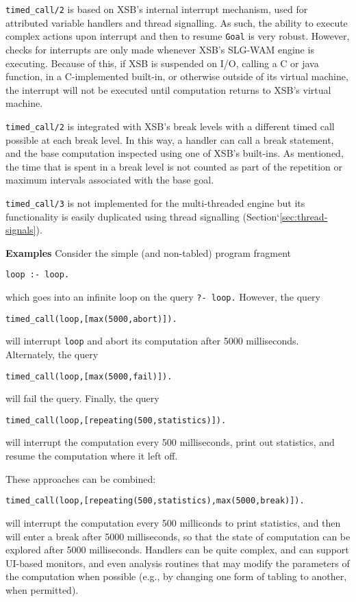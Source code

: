 \begin{description}
{\tt timed\_call/2} is based on XSB's internal interrupt mechanism,
used for attributed variable handlers and thread signalling.  As such,
the ability to execute complex actions upon interrupt and then to
resume {\tt Goal} is very robust.  However, checks for interrupts are
only made whenever XSB's SLG-WAM engine is executing.  Because of
this, if XSB is suspended on I/O, calling a C or java function, in a
C-implemented built-in, or otherwise outside of its virtual machine,
the interrupt will not be executed until computation returns to XSB's
virtual machine.

{\tt timed\_call/2} is integrated with XSB's break levels with a
different timed call possible at each break level.  In this way, a
handler can call a break statement, and the base computation inspected
using one of XSB's built-ins.  As mentioned, the time that is spent in
a break level is not counted as part of the repetition or maximum intervals associated with the base goal.

{\tt timed\_call/3} is not implemented for the multi-threaded engine
but its functionality is easily duplicated using thread signalling
(Section`\ref{sec:thread-signals}).

{\bf Examples}
Consider the simple (and non-tabled) program fragment
\begin{verbatim}
loop :- loop.
\end{verbatim}
which goes into an infinite loop on the query {\tt ?- loop.}  However,
the query
\begin{verbatim}
timed_call(loop,[max(5000,abort)]).
\end{verbatim}
will interrupt {\tt loop} and abort its computation after 5000
milliseconds.  Alternately, the query
\begin{verbatim}
timed_call(loop,[max(5000,fail)]).
\end{verbatim}
will fail the query.  Finally, the query
\begin{verbatim}
timed_call(loop,[repeating(500,statistics)]).
\end{verbatim}
will interrupt the computation every 500 milliseconds, print out
statistics, and resume the computation where it left off.

These approaches can be combined: 
\begin{verbatim}
timed_call(loop,[repeating(500,statistics),max(5000,break)]).
\end{verbatim}
will interrupt the computation every 500 milliconds to print
statistics, and then will enter a break after 5000 milliseconds, so
that the state of computation can be explored after 5000 milliseconds.
Handlers can be quite complex, and can support UI-based monitors, and
even analysis routines that may modify the parameters of the
computation when possible (e.g., by changing one form of tabling to
another, when permitted).


\end{description}

